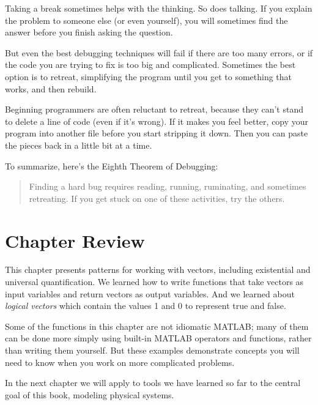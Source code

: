 
Taking a break sometimes helps with the thinking.  So does talking.
If you explain the problem to someone else (or even yourself), you
will sometimes find the answer before you finish asking the question.

But even the best debugging techniques will fail if there are too many
errors, or if the code you are trying to fix is too big and
complicated.  Sometimes the best option is to retreat, simplifying the
program until you get to something that works, and then rebuild.

Beginning programmers are often reluctant to retreat, because
they can't stand to delete a line of code (even if it's wrong).
If it makes you feel better, copy your program into another file
before you start stripping it down.  Then you can paste the pieces
back in a little bit at a time.


To summarize, here's the Eighth Theorem of Debugging:

\begin{quote}
Finding a hard bug requires reading, running, ruminating,
and sometimes retreating.  If you get stuck on one of these
activities, try the others.
\end{quote}

\section{Chapter Review}

This chapter presents patterns for working with vectors, including existential and universal quantification.
We learned how to write functions that take vectors as input variables and return vectors as output variables.
And we learned about {\em logical vectors} which contain the values 1 and 0 to represent true and false.

Some of the functions in this chapter are not idiomatic MATLAB; many of them can be done more simply using built-in MATLAB operators and functions, rather than writing them yourself.  But these examples demonstrate concepts you will need to know when you work on more complicated problems.

In the next chapter we will apply to tools we have learned so far to the central goal of this book, modeling physical systems.





